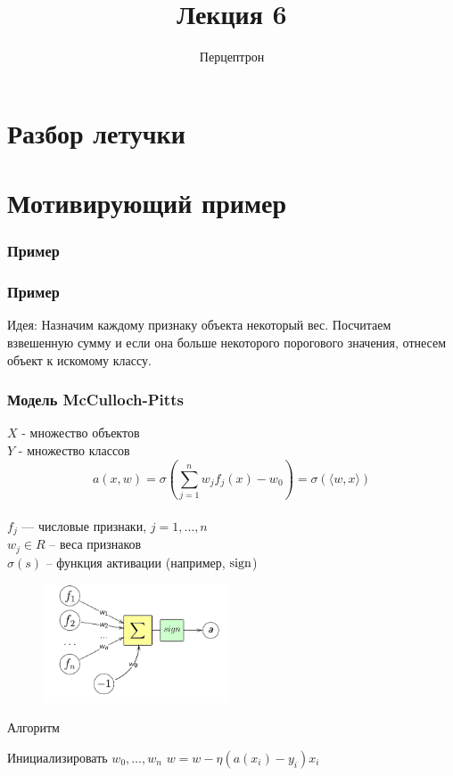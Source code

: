 \documentclass[10pt]{beamer}
\title{Лекция 6}
\subtitle{Перцептрон}
\begin{document}
\maketitle

\section{Разбор летучки}

\section{Мотивирующий пример}

\begin{frame}\frametitle{Пример}
\end{frame}

\begin{frame}\frametitle{Пример}
  \alert{Идея}: Назначим каждому признаку объекта некоторый вес. Посчитаем взвешенную сумму и если она больше некоторого порогового значения, отнесем объект к искомому классу. 
\end{frame}

\begin{frame}\frametitle{Модель McCulloch-Pitts}
  $X$ - множество объектов \\
	$Y$ - множество классов \\
	\pause
	$$a(x,w) = \sigma(\sum\limits_{j=1}^n w_j f_j(x) - w_0) = \sigma(\langle w, x \rangle)$$\\
  $f_j$ — числовые признаки, $j = 1,\dots, n$ \\	
	$w_j \in R$ -- веса признаков\\
	$\sigma(s)$ -- функция активации (например, $\operatorname{sign}$)
	\pause
	\begin{figure}[htbp]
	  \includegraphics[height=100pt, keepaspectratio = true]{images/neuron-scheme}   
	\end{figure}
\end{frame}

\begin{frame}{Алгоритм}
	\begin{algorithmic}[1]
            \State Инициализировать ${w_0, \dots, w_n}$
                 \State $w = w - \eta (a(x_i) - y_i) x_i$
               \EndFor
           	\EndRepeat
        \EndFunction
    \end{algorithmic}
\end{frame}
\end{document}
